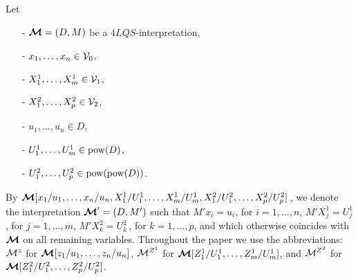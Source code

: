 \documentclass{fundam}
\newcommand{\model}{\ensuremath{\mbox{\boldmath $\mathcal{M}$}}\xspace}
\newcommand{\pow}{\mbox{\rm pow}}
\newcommand{\QLQS}{\ensuremath{\mbox{$4\mathit{LQS}$}}\xspace}
\begin{document}
Let
\begin{itemize}
    \item[-]$\model=(D,M)$ be a $\QLQS$-interpretation,
    \item[-]  $x_{1},\ldots,x_{n} \in {\cal V}_{0}$,

    \item[-]  $X_{1}^{1},\ldots,X_{m}^{1} \in {\cal V}_{1}$,

    \item[-]  $X_{1}^{2},\ldots,X_{p}^{2} \in {\cal V}_{2}$,

    \item[-]  $u_{1},\ldots,u_{n} \in D$,

    \item[-]  $U_{1}^{1},\ldots,U_{m}^{1} \in \pow(D)$,

    \item[-]  $U_{1}^{2},\ldots,U_{p}^{2} \in \pow(\pow(D))$.
\end{itemize}
By $\model[x_{1}/u_{1},\ldots,x_{n}/u_{n},
         X_{1}^{1}/U_{1}^{1},\ldots,X_{m}^{1}/U_{m}^{1},
         X_{1}^{2}/U_{1}^{2},\ldots,X_{p}^2/U_{p}^{2}]\,$,
we denote the interpretation $\model' = (D,M')$ such that $M'x_{i}  =  u_{i}$, for $i = 1,\ldots,n$,
$M'X_{j}^{1} =  U_{j}^{1}$,  for $j = 1,\ldots,m$, $M'X_{k}^{2} =  U_{k}^{2}\,$, for $k = 1,\ldots,p$,
and which otherwise coincides with $\model$ on all remaining
variables.
Throughout the paper we use the abbreviations: ${\cal
M}^{z}$ for $\model[z_{1}/u_{1},\ldots,z_{n}/u_{n}]$, ${\cal
M}^{Z^1}$ for $\model[Z_{1}^{1}/U_{1}^{1},\ldots,Z_{m}^{1}/U_{m}^{1}]$, and ${\cal
M}^{Z^2}$ for $\model[Z_{1}^{2}/U_{1}^{2},\ldots,Z_{p}^2/U_{p}^{2}]$.
\end{document}
